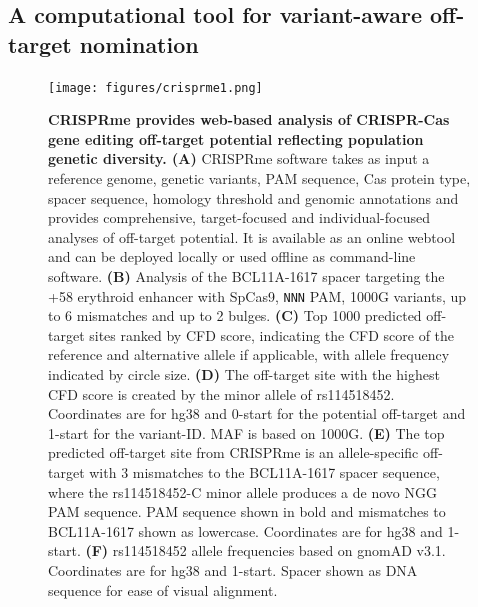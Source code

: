 \documentclass[a4paper, titlepage, openright]{book}
\begin{document}
\subsection{A computational tool for variant-aware off-target nomination}
\begin{figure}
	\centering
	\texttt{[image: figures/crisprme1.png]}
	\caption[CRISPRme provides web-based analysis of CRISPR-Cas gene editing off-target potential reflecting population genetic diversity]{\textbf{CRISPRme provides web-based analysis of CRISPR-Cas gene editing off-target potential reflecting population genetic diversity. (A)} CRISPRme software takes as input a reference genome, genetic variants, PAM sequence, Cas protein type, spacer sequence, homology threshold and genomic annotations and provides comprehensive, target-focused and individual-focused analyses of off-target potential. It is available as an online webtool and can be deployed locally or used offline as command-line software. \textbf{(B)} Analysis of the BCL11A-1617 spacer targeting the +58 erythroid enhancer with SpCas9, \texttt{NNN} PAM, 1000G variants, up to 6 mismatches and up to 2 bulges. \textbf{(C)} Top 1000 predicted off-target sites ranked by CFD score, indicating the CFD score of the reference and alternative allele if applicable, with allele frequency indicated by circle size. \textbf{(D)} The off-target site with the highest CFD score is created by the minor allele of rs114518452. Coordinates are for hg38 and 0-start for the potential off-target and 1-start for the variant-ID. MAF is based on 1000G. \textbf{(E)} The top predicted off-target site from CRISPRme is an allele-specific off-target with 3 mismatches to the BCL11A-1617 spacer sequence, where the rs114518452-C minor allele produces a de novo NGG PAM sequence. PAM sequence shown in bold and mismatches to BCL11A-1617 shown as lowercase. Coordinates are for hg38 and 1-start. \textbf{(F)} rs114518452 allele frequencies based on gnomAD v3.1. Coordinates are for hg38 and 1-start. Spacer shown as DNA sequence for ease of visual alignment.}
	\label{fig:crisprme1}
\end{figure} 
\end{document}
